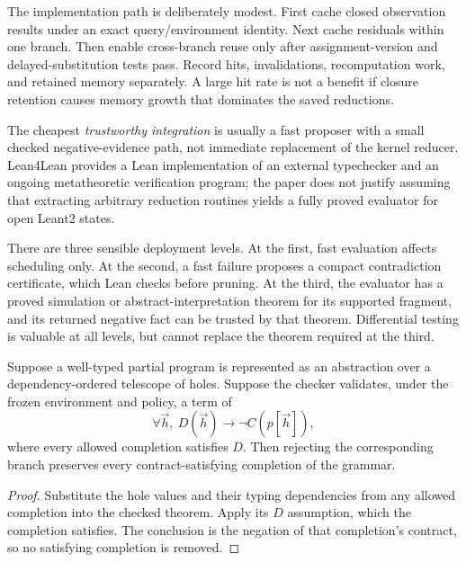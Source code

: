 The implementation path is deliberately modest. First cache closed observation results under an exact query/environment identity. Next cache residuals within one branch. Then enable cross-branch reuse only after assignment-version and delayed-substitution tests pass. Record hits, invalidations, recomputation work, and retained memory separately. A large hit rate is not a benefit if closure retention causes memory growth that dominates the saved reductions.


\answer The cheapest \emph{trustworthy integration} is usually a fast proposer with a small checked negative-evidence path, not immediate replacement of the kernel reducer. Lean4Lean provides a Lean implementation of an external typechecker and an ongoing metatheoretic verification program; the paper does not justify assuming that extracting arbitrary reduction routines yields a fully proved evaluator for open Leant2 states.\cite{lean4lean}

There are three sensible deployment levels. At the first, fast evaluation affects scheduling only. At the second, a fast failure proposes a compact contradiction certificate, which Lean checks before pruning. At the third, the evaluator has a proved simulation or abstract-interpretation theorem for its supported fragment, and its returned negative fact can be trusted by that theorem. Differential testing is valuable at all levels, but cannot replace the theorem required at the third.

\begin{proposition}\label{prop:residual}
Suppose a well-typed partial program is represented as an abstraction over a dependency-ordered telescope of holes. Suppose the checker validates, under the frozen environment and policy, a term of
\[
 \forall \vec h,\ D(\vec h)\to \neg C(p[\vec h]),
\]
where every allowed completion satisfies $D$. Then rejecting the corresponding branch preserves every contract-satisfying completion of the grammar.
\end{proposition}
\begin{proof}
Substitute the hole values and their typing dependencies from any allowed completion into the checked theorem. Apply its $D$ assumption, which the completion satisfies. The conclusion is the negation of that completion's contract, so no satisfying completion is removed.
\end{proof}

